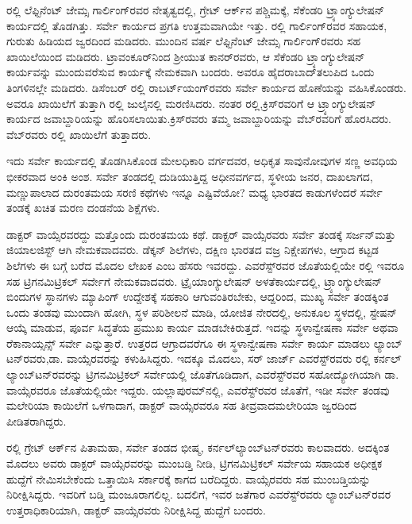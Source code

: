 ರಲ್ಲಿ ಲೆಫ್ಟಿನೆಂಟ್​ ಜೇಮ್ಸ ಗಾರ್ಲಿಂಗ್​ರವರ ನೇತೃತ್ವದಲ್ಲಿ, ಗ್ರೇಟ್​ ಆರ್ಕ್‌ನ ಪಶ್ಚಿಮಕ್ಕೆ, ಸೆಕೆಂಡರಿ ಟ್ರ್ಯಾಂಗ್ಯುಲೇಷನ್​ ಕಾರ್ಯದಲ್ಲಿ ತೊಡಗಿತ್ತು. ಸರ್ವೇ ಕಾರ್ಯದ ಪ್ರಗತಿ ಉತ್ತಮವಾಗಿಯೇ ಇತ್ತು. ರಲ್ಲಿ ಗಾರ್ಲಿಂಗ್​ರವರ ಸಹಾಯಕ, ಗುರುತು ಹಿಡಿಯದ ಜ್ವರದಿಂದ ಮಡಿದರು. ಮುಂದಿನ ವರ್ಷ ಲೆಫ್ಟಿನೆಂಟ್​ ಜೇಮ್ಸ ಗಾರ್ಲಿಂಗ್​ರವರು ಸಹ ಖಾಯಿಲೆಯಿಂದ ಮಡಿದರು. ಟ್ರಾವಂಕೂರ್​ನಿಂದ ಶ‍್ರೀಯುತ ಕಾನರ್​ರವರು, ಆ ಸೆಕೆಂಡರಿ ಟ್ರ್ಯಾಂಗ್ಯುಲೇಷನ್​ ಕಾರ್ಯವನ್ನು ಮುಂದುವರೆಸುವ ಕಾರ್ಯಕ್ಕೆ ನೇಮಕವಾಗಿ ಬಂದರು. ಅವರೂ ಹೈದರಾಬಾದ್​ ತಲುಪಿದ ಒಂದು ತಿಂಗಳಿನಲ್ಲೇ ಮಡಿದರು. ಡಿಸೆಂಬರ್​ ರಲ್ಲಿ ರಾಬರ್ಟ್‌ಯಂಗ್​ರವರು ಸರ್ವೇ ಕಾರ್ಯದ ಹೊಣೆಯನ್ನು ವಹಿಸಿಕೊಂಡರು. ಅವರೂ ಖಾಯಿಲೆಗೆ ತುತ್ತಾಗಿ ರಲ್ಲಿ ಜುಲೈನಲ್ಲಿ ಮರಣಿಸಿದರು. ನಂತರ ರಲ್ಲಿ,\break ಕ್ರಿಸ್​ರವರಿಗೆ ಆ ಟ್ರ್ಯಾಂಗ್ಯುಲೇಷನ್​ ಕಾರ್ಯದ ಜವಾಬ್ದಾರಿಯನ್ನು ಹೊರಿಸಲಾಯಿತು.\break ಕ್ರಿಸ್​ರವರು ತಮ್ಮ ಜವಾಬ್ದಾರಿಯನ್ನು ವೆಬ್​ರವರಿಗೆ ಹೊರಸಿದರು. ವೆಬ್​ರವರು ರಲ್ಲಿ ಖಾಯಿಲೆಗೆ ತುತ್ತಾದರು.

ಇದು ಸರ್ವೇ ಕಾರ್ಯದಲ್ಲಿ ತೊಡಗಿಸಿಕೊಂಡ ಮೇಲಧಿಕಾರಿ ವರ್ಗದವರ, ಅಧಿಕೃತ ಸಾವುನೋವುಗಳ ಸಣ್ಣ ಅವಧಿಯ ಭೀಕರವಾದ ಅಂಕಿ ಅಂಶ. ಸರ್ವೇ ತಂಡದಲ್ಲಿ ದುಡಿಯುತ್ತಿದ್ದ ಅಧೀನವರ್ಗದ, ಸ್ಥಳೀಯ ಜನರ, ದಾಖಲಾಗದ, ಮಣ್ಣುಪಾಲಾದ ದುರಂತಮಯ ಸರಣಿ ಕಥೆಗಳು ಇನ್ನೂ ಎಷ್ಟಿವೆಯೋ? ಮಧ್ಯ ಭಾರತದ ಕಾಡುಗಳೆಂದರೆ ಸರ್ವೇ ತಂಡಕ್ಕೆ ಖಚಿತ ಮರಣ ದಂಡನೆಯ ಶಿಕ್ಷೆಗಳು.

ಡಾಕ್ಟರ್​ ವಾಯ್ಸೆರವರದ್ದು ಮತ್ತೊಂದು ದುರಂತಮಯ ಕಥೆ. ಡಾಕ್ಟರ್​ ವಾಯ್ಸೆರವರು ಸರ್ವೇ ತಂಡಕ್ಕೆ ಸರ್ಜನ್​ ಮತ್ತು ಜಿಯಾಲಜಿಸ್ಟ್​ ಆಗಿ ನೇಮಕವಾದವರು. ಡೆಕ್ಕನ್​ ಶಿಲೆಗಳು, ದಕ್ಷಿಣ ಭಾರತದ ವಜ್ರ ನಿಕ್ಷೇಪಗಳು, ಆಗ್ರಾದ ಕಟ್ಟಡ ಶಿಲೆಗಳು ಈ ಬಗ್ಗೆ ಬರೆದ ಮೊದಲ ಲೇಖಕ ಎಂಬ ಹೆಸರು ಇವರದ್ದು. ಎವರೆಸ್ಟ್​ರವರ ಜೊತೆಯಲ್ಲಿಯೇ ರಲ್ಲಿ ಇವರೂ ಸಹ ಟ್ರಿಗನಮಿಟ್ರಿಕಲ್​ ಸರ್ವೇಗೆ ನೇಮಕವಾದವರು. ಟ್ರೈಯಾಂಗ್ಯುಲೇಷನ್​ ಅಳತೆ\break ಕಾರ್ಯದಲ್ಲಿ, ಟ್ರ್ಯಾಂಗ್ಯುಲೇಷನ್​ ಬಿಂದುಗಳ ಸ್ಥಾನಗಳು ಮ್ಯಾಪಿಂಗ್​ ಉದ್ದೇಶಕ್ಕೆ ಸಹಕಾರಿ ಆಗುವಂತಿರಬೇಕು, ಆದ್ದರಿಂದ, ಮುಖ್ಯ ಸರ್ವೇ ತಂಡಕ್ಕಿಂತ ಒಂದು ತಂಡವು ಮುಂದಾಗಿ ಹೋಗಿ, ಸ್ಥಳ ಪರಿಶೀಲನೆ ಮಾಡಿ, ಯೋಜಿತ ನೇರದಲ್ಲಿ, ಅನುಕೂಲ ಸ್ಥಳದಲ್ಲಿ, ಸ್ಟೇಷನ್​ ಆಯ್ಕೆ ಮಾಡುವ, ಪೂರ್ವ ಸಿದ್ಧತೆಯ ಪ್ರಮುಖ ಕಾರ್ಯ ಮಾಡಬೇಕಿರುತ್ತದೆ. ಇದನ್ನು ಸ್ಥಳಾನ್ವೇಷಣಾ ಸರ್ವೇ ಅಥವಾ ರೆಕಾನಾಯ್ಸನ್ಸ್​ ಸರ್ವೇ ಎನ್ನುತ್ತಾರೆ. ಉತ್ತರದ ಆಗ್ರಾದವರೆಗೂ ಈ ಸ್ಥಳಾನ್ವೇಷಣಾ ಸರ್ವೇ ಕಾರ್ಯ ಮಾಡಲು ಲ್ಯಾಂಬ್​ಟನ್​ರವರು,\break ಡಾ. ವಾಯ್ಸೆರವರನ್ನು ಕಳುಹಿಸಿದ್ದರು. ಇದಕ್ಕೂ ಮೊದಲು, ಸರ್​ ಜಾರ್ಜ್ ಎವರೆಸ್ಟ್​ರವರು ರಲ್ಲಿ ಕರ್ನಲ್​ ಲ್ಯಾಂಬ್​ಟನ್​ರವರನ್ನು ಟ್ರಿಗನಮಿಟ್ರಿಕಲ್​ ಸರ್ವೇಯಲ್ಲಿ ಜೊತೆಗೂಡಿದಾಗ, ಎವರೆಸ್ಟ್​ರವರ ಸಹೋದ್ಯೋಗಿಯಾಗಿ ಡಾ. ವಾಯ್ಸೆರವರೂ ಜೊತೆಯಲ್ಲಿಯೇ ಇದ್ದರು. ಯಲ್ಲಾಪುರಮ್‌ನಲ್ಲಿ, ಎವರೆಸ್ಟ್​ರವರ ಜೊತೆಗೆ, ಇಡೀ ಸರ್ವೇ ತಂಡವು ಮಲೇರಿಯಾ ಕಾಯಿಲೆಗೆ ಒಳಗಾದಾಗ, ಡಾಕ್ಟರ್​ ವಾಯ್ಸೆರವರೂ ಸಹ ತೀವ್ರವಾದ\break ಮಲೇರಿಯಾ ಜ್ವರದಿಂದ ಪೀಡಿತರಾಗಿದ್ದರು.

ರಲ್ಲಿ ಗ್ರೇಟ್​ ಆರ್ಕ್‌ನ ಪಿತಾಮಹಾ, ಸರ್ವೇ ತಂಡದ ಭೀಷ್ಮ, ಕರ್ನಲ್​\break ಲ್ಯಾಂಬ್​ಟನ್​ರವರು ಕಾಲವಾದರು. ಅದಕ್ಕಿಂತ ಮೊದಲು ಅವರು ಡಾಕ್ಟರ್​ ವಾಯ್ಸೆರವರನ್ನು ಮುಂಬಡ್ತಿ ನೀಡಿ, ಟ್ರಿಗನಮಿಟ್ರಿಕಲ್​ ಸರ್ವೇಯ ಸಹಾಯಕ ಅಧೀಕ್ಷಕ ಹುದ್ದೆಗೆ ನೇಮಿಸಬೇಕೆಂದು ಒತ್ತಾಯಿಸಿ ಸರ್ಕಾರಕ್ಕೆ ಕಾಗದ ಬರೆದಿದ್ದರು. ವಾಯ್ಸೆರವರು ಸಹ ಮುಂಬಡ್ತಿಯನ್ನು ನಿರೀಕ್ಷಿಸಿದ್ದರು. ಇವರಿಗೆ ಬಡ್ತಿ ಮಂಜೂರಾಗಲಿಲ್ಲ. ಬದಲಿಗೆ, ಇವರ ಜತೆಗಾರ ಎವರೆಸ್ಟ್​ರವರು ಲ್ಯಾಂಬ್​ಟನ್​ರವರ ಉತ್ತರಾಧಿಕಾರಿಯಾಗಿ, ಡಾಕ್ಟರ್​ ವಾಯ್ಸೆರವರು ನಿರೀಕ್ಷಿಸಿದ್ದ ಹುದ್ದೆಗೆ ಬಂದರು.

